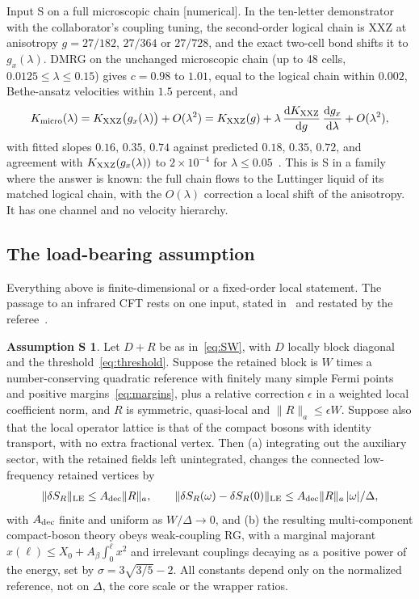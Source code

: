 \documentclass[11pt]{article}
\theoremstyle{definition}
\newtheorem*{assumption}{Assumption S}
\newcommand{\dd}{\mathrm{d}}
\newcommand{\st}[1]{\textup{[\textsf{#1}]}}
\begin{document}
Input S on a full microscopic chain \st{numerical}. In the ten-letter demonstrator with the collaborator's coupling tuning, the second-order logical chain is XXZ at anisotropy $g=27/182$, $27/364$ or $27/728$, and the exact two-cell bond shifts it to $g_x(\lambda)$. DMRG on the unchanged microscopic chain (up to 48 cells, $0.0125\le\lambda\le0.15$) gives $c=0.98$ to $1.01$, equal to the logical chain within $0.002$, Bethe-ansatz velocities within $1.5$ percent, and
\begin{align}
K_{\rm micro}(\lambda)=K_{\rm XXZ}\big(g_x(\lambda)\big)+O(\lambda^2)=K_{\rm XXZ}(g)+\lambda\,\frac{\dd K_{\rm XXZ}}{\dd g}\,\frac{\dd g_x}{\dd\lambda}+O(\lambda^2),
\label{eq:Kdemo}
\end{align}
with fitted slopes $0.16,\,0.35,\,0.74$ against predicted $0.18,\,0.35,\,0.72$, and agreement with $K_{\rm XXZ}(g_x(\lambda))$ to $2\times10^{-4}$ for $\lambda\le0.05$~\cite{demoLL}. This is S in a family where the answer is known: the full chain flows to the Luttinger liquid of its matched logical chain, with the $O(\lambda)$ correction a local shift of the anisotropy. It has one channel and no velocity hierarchy.

\subsection{The load-bearing assumption}
\label{sec:S}

Everything above is finite-dimensional or a fixed-order local statement. The passage to an infrared CFT rests on one input, stated in~\cite[\S5]{C45} and restated by the referee~\cite{refC44}.

\begin{assumption}
Let $D+R$ be as in~\eqref{eq:SW}, with $D$ locally block diagonal and the threshold~\eqref{eq:threshold}. Suppose the retained block is $W$ times a number-conserving quadratic reference with finitely many simple Fermi points and positive margins~\eqref{eq:margins}, plus a relative correction $\epsilon$ in a weighted local coefficient norm, and $R$ is symmetric, quasi-local and $\|R\|_a\le\epsilon W$. Suppose also that the local operator lattice is that of the compact bosons with identity transport, with no extra fractional vertex. Then (a) integrating out the auxiliary sector, with the retained fields left unintegrated, changes the connected low-frequency retained vertices by
\begin{align}
\|\delta S_R\|_{\rm LE}\le A_{\rm dec}\|R\|_a,\qquad \|\delta S_R(\omega)-\delta S_R(0)\|_{\rm LE}\le A_{\rm dec}\|R\|_a\,|\omega|/\Delta,
\label{eq:Sa}
\end{align}
with $A_{\rm dec}$ finite and uniform as $W/\Delta\to0$, and (b) the resulting multi-component compact-boson theory obeys weak-coupling RG, with a marginal majorant $x(\ell)\le X_0+A_\beta\int_0^\ell x^2$ and irrelevant couplings decaying as a positive power of the energy, set by $\sigma=3\sqrt{3/5}-2$. All constants depend only on the normalized reference, not on $\Delta$, the core scale or the wrapper ratios.
\end{assumption}
\end{document}
